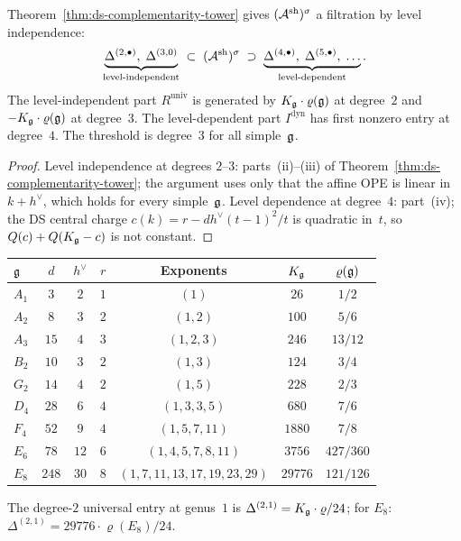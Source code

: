 \begin{corollary}
\label{cor:level-independence-filtration}
Theorem~\textup{\ref{thm:ds-complementarity-tower}} gives
$(\mathcal{A}^{\mathrm{sh}})^\sigma$ a filtration by level independence:
\begin{equation}\label{eq:filtration}
\underbrace{
\Delta^{(2,\bullet)},\;\Delta^{(3,0)}
}_{\text{level-independent}}
\;\subset\;
(\mathcal{A}^{\mathrm{sh}})^\sigma
\;\supset\;
\underbrace{
\Delta^{(4,\bullet)},\;\Delta^{(5,\bullet)},\;\ldots
}_{\text{level-dependent}}.
\end{equation}
The level-independent part $R^{\mathrm{univ}}$
is generated by $K_{\mathfrak{g}} \cdot \varrho(\mathfrak{g})$
at degree~$2$ and $-K_{\mathfrak{g}} \cdot \varrho(\mathfrak{g})$ at degree~$3$.
The level-dependent part $I^{\mathrm{dyn}}$
has first nonzero entry at degree~$4$.
The threshold is degree~$3$ for all simple~$\mathfrak{g}$.
\end{corollary}

\begin{proof}
Level independence at degrees $2$--$3$: parts~(ii)--(iii) of
Theorem~\ref{thm:ds-complementarity-tower}; the argument uses only
that the affine OPE is linear in $k + h^\vee$, which holds for
every simple~$\mathfrak{g}$.
Level dependence at degree~$4$: part~(iv); the DS central charge
$c(k) = r - dh^\vee(t{-}1)^2/t$ is quadratic in~$t$, so
$Q(c) + Q(K_{\mathfrak{g}} - c)$ is not constant.
\end{proof}

\begin{computation}
\label{comp:koszul-conductor-all-types}
\renewcommand{\arraystretch}{1.3}
\begin{center}
\small
\begin{tabular}{lcccccc}
\toprule
$\mathfrak{g}$ & $d$ & $h^\vee$ & $r$ & Exponents & $K_{\mathfrak{g}}$ & $\varrho(\mathfrak{g})$ \\
\midrule
$A_1$ & $3$ & $2$ & $1$ & $(1)$ & $26$ & $1/2$ \\
$A_2$ & $8$ & $3$ & $2$ & $(1,2)$ & $100$ & $5/6$ \\
$A_3$ & $15$ & $4$ & $3$ & $(1,2,3)$ & $246$ & $13/12$ \\
$B_2$ & $10$ & $3$ & $2$ & $(1,3)$ & $124$ & $3/4$ \\
$G_2$ & $14$ & $4$ & $2$ & $(1,5)$ & $228$ & $2/3$ \\
$D_4$ & $28$ & $6$ & $4$ & $(1,3,3,5)$ & $680$ & $7/6$ \\
$F_4$ & $52$ & $9$ & $4$ & $(1,5,7,11)$ & $1880$ & $7/8$ \\
$E_6$ & $78$ & $12$ & $6$ & $(1,4,5,7,8,11)$ & $3756$ & $427/360$ \\
$E_8$ & $248$ & $30$ & $8$ & $(1,7,11,13,17,19,23,29)$ & $29776$ & $121/126$ \\
\bottomrule
\end{tabular}
\end{center}
The degree-$2$ universal entry at genus~$1$ is
$\Delta^{(2,1)} = K_{\mathfrak{g}} \cdot \varrho / 24$; for $E_8$:
$\Delta^{(2,1)} = 29776 \cdot \varrho(E_8) / 24$.
\end{computation}

